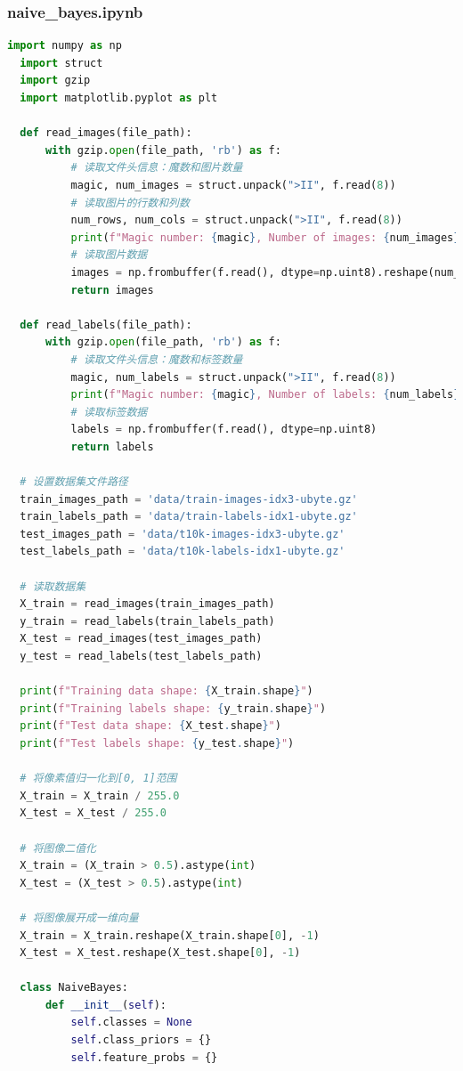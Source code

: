 \documentclass[12pt]{article}
\begin{document}
\subsubsection{naive\_bayes.ipynb}
\begin{lstlisting}[language=Python]
  import numpy as np
  import struct
  import gzip
  import matplotlib.pyplot as plt
  
  def read_images(file_path):
      with gzip.open(file_path, 'rb') as f:
          # 读取文件头信息：魔数和图片数量
          magic, num_images = struct.unpack(">II", f.read(8))
          # 读取图片的行数和列数
          num_rows, num_cols = struct.unpack(">II", f.read(8))
          print(f"Magic number: {magic}, Number of images: {num_images}, Rows: {num_rows}, Columns: {num_cols}")
          # 读取图片数据
          images = np.frombuffer(f.read(), dtype=np.uint8).reshape(num_images, num_rows, num_cols)
          return images
  
  def read_labels(file_path):
      with gzip.open(file_path, 'rb') as f:
          # 读取文件头信息：魔数和标签数量
          magic, num_labels = struct.unpack(">II", f.read(8))
          print(f"Magic number: {magic}, Number of labels: {num_labels}")
          # 读取标签数据
          labels = np.frombuffer(f.read(), dtype=np.uint8)
          return labels
  
  # 设置数据集文件路径
  train_images_path = 'data/train-images-idx3-ubyte.gz'
  train_labels_path = 'data/train-labels-idx1-ubyte.gz'
  test_images_path = 'data/t10k-images-idx3-ubyte.gz'
  test_labels_path = 'data/t10k-labels-idx1-ubyte.gz'
  
  # 读取数据集
  X_train = read_images(train_images_path)
  y_train = read_labels(train_labels_path)
  X_test = read_images(test_images_path)
  y_test = read_labels(test_labels_path)
  
  print(f"Training data shape: {X_train.shape}")
  print(f"Training labels shape: {y_train.shape}")
  print(f"Test data shape: {X_test.shape}")
  print(f"Test labels shape: {y_test.shape}")
  
  # 将像素值归一化到[0, 1]范围
  X_train = X_train / 255.0
  X_test = X_test / 255.0
  
  # 将图像二值化
  X_train = (X_train > 0.5).astype(int)
  X_test = (X_test > 0.5).astype(int)
  
  # 将图像展开成一维向量
  X_train = X_train.reshape(X_train.shape[0], -1)
  X_test = X_test.reshape(X_test.shape[0], -1)
  
  class NaiveBayes:
      def __init__(self):
          self.classes = None
          self.class_priors = {}
          self.feature_probs = {}
  

\end{lstlisting}
\end{document}
